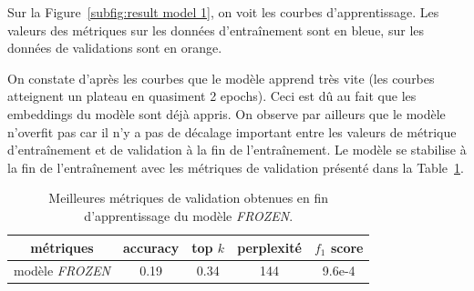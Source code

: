 \documentclass[a4paper]{article}
\begin{document}
Sur la Figure~\ref{subfig:result model 1}, on voit les courbes d'apprentissage. Les valeurs des métriques sur les données 
d'entraînement sont en bleue, sur les données de validations sont en orange.

On constate d'après les courbes que le modèle apprend très vite (les courbes atteignent un plateau en quasiment 2 epochs). Ceci 
est dû au fait que les embeddings du modèle sont déjà appris. On observe par ailleurs que le modèle n'overfit pas car il n'y a pas 
de décalage important entre les valeurs de métrique d'entraînement et de validation à la fin de l'entraînement. Le modèle se 
stabilise à la fin de l'entraînement avec les métriques de validation présenté dans la Table~\ref{tab:metriques model1}.


\begin{table}
    \centering
    \begin{tabular}{|c|c|c|c|c|}
        \hline
        métriques & accuracy  & top $k$  & perplexité  & $f_1$ score \\
        \hline
        modèle \textit{FROZEN} & 0.19 & 0.34  & 144 & 9.6e-4 \\
        \hline
    \end{tabular}
    \caption{Meilleures métriques de validation obtenues en fin d'apprentissage du modèle \textit{FROZEN}.}
    \label{tab:metriques model1}
\end{table}
\end{document}

